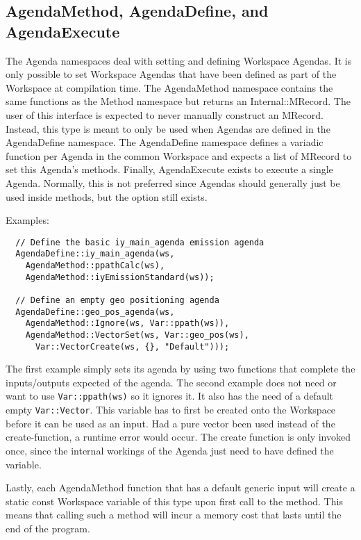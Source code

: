 \subsection{AgendaMethod, AgendaDefine, and AgendaExecute}
\label{sec:cpp_api:usage:agenda}
The Agenda namespaces deal with setting and defining Workspace Agendas.
It is only possible to set Workspace Agendas that have been defined as part
of the Workspace at compilation time.  The AgendaMethod namespace contains
the same functions as the Method namespace but returns an Internal::MRecord.
The user of this interface is expected to never manually construct an MRecord.
Instead, this type is meant to only be used when Agendas are defined in the
AgendaDefine namespace.  The AgendaDefine namespace defines a variadic 
function per Agenda in the common Workspace and expects a list of MRecord
to set this Agenda's methods.  Finally, AgendaExecute exists to execute a single
Agenda.  Normally, this is not preferred since Agendas should generally just
be used inside methods, but the option still exists.

Examples:
\begin{verbatim}
  // Define the basic iy_main_agenda emission agenda
  AgendaDefine::iy_main_agenda(ws,
    AgendaMethod::ppathCalc(ws),
    AgendaMethod::iyEmissionStandard(ws));
  
  // Define an empty geo positioning agenda
  AgendaDefine::geo_pos_agenda(ws,
    AgendaMethod::Ignore(ws, Var::ppath(ws)),
    AgendaMethod::VectorSet(ws, Var::geo_pos(ws),
      Var::VectorCreate(ws, {}, "Default")));
\end{verbatim}
The first example simply sets its agenda by using two functions that
complete the inputs/outputs expected of the agenda.  The second example
does not need or want to use \verb|Var::ppath(ws)| so it ignores it.  It also
has the need of a default empty \verb|Var::Vector|.  This variable
has to first be created onto the Workspace before it can be used as an 
input.  Had a pure vector been used instead of the create-function,
a runtime error would occur.  The create function is only invoked once,
since the internal workings of the Agenda just need to have defined
the variable.

Lastly, each AgendaMethod function that has a default generic input will
create a static const Workspace variable of this type upon first call to
the method.  This means that calling such a method will incur a memory cost
that lasts until the end of the program.
